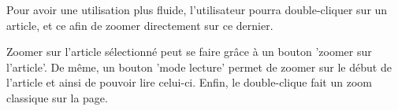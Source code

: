 \begin{leftonly}
Pour avoir une utilisation plus fluide, l’utilisateur pourra double-cliquer sur un article, et ce afin de zoomer directement sur ce dernier.
\end{leftonly}

Zoomer sur l'article sélectionné peut se faire grâce à un bouton 'zoomer sur l'article'. De même, un bouton 'mode lecture' permet de zoomer sur le début de l'article et ainsi de pouvoir lire celui-ci. Enfin, le double-clique fait un zoom classique sur la page.